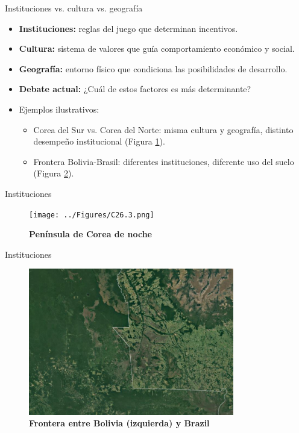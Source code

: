 \documentclass{beamer}
\begin{document}
\begin{frame}{Instituciones vs. cultura vs. geografía}
    \begin{itemize}
        \item \textbf{Instituciones:} reglas del juego que determinan incentivos.
        \item \textbf{Cultura:} sistema de valores que guía comportamiento económico y social.
        \item \textbf{Geografía:} entorno físico que condiciona las posibilidades de desarrollo.
        \item \textbf{Debate actual:} ¿Cuál de estos factores es más determinante?
        \item Ejemplos ilustrativos:
        \begin{itemize}
            \item Corea del Sur vs. Corea del Norte: misma cultura y geografía, distinto desempeño institucional (Figura \ref{fig:korea}).
            \item Frontera Bolivia-Brasil: diferentes instituciones, diferente uso del suelo (Figura \ref{fig:bolivia}).
        \end{itemize}
    \end{itemize}
\end{frame}

\begin{frame}{Instituciones}
    \begin{figure}[H]
    \begin{center}
    \texttt{[image: ../Figures/C26.3.png]}
    \end{center}
    \caption{\textbf{Península de Corea de noche}}
    \label{fig:korea}
    \end{figure}
\end{frame}

\begin{frame}{Instituciones}
    
    \begin{figure}[H]
        \begin{center}
            \includegraphics[width=0.8\textwidth]{../Figures/C26.2.png}
        \end{center}
        \caption{\textbf{Frontera entre Bolivia (izquierda) y Brazil}}
        \label{fig:bolivia}
    \end{figure}
\end{frame}
% 
\end{document}
